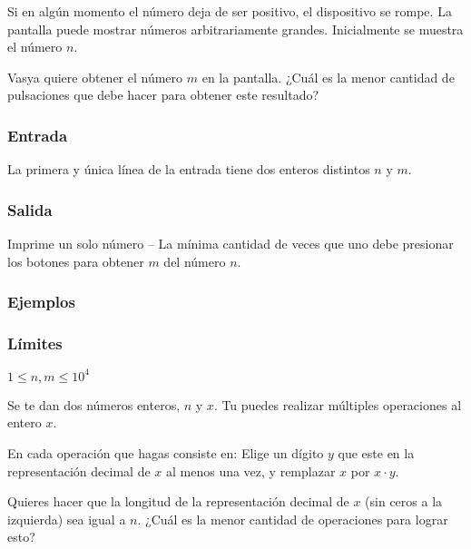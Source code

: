 Si en algún momento el número deja de ser positivo, el dispositivo se rompe. La pantalla puede mostrar números arbitrariamente grandes. Inicialmente se muestra el número \(n\).

Vasya quiere obtener el número \(m\) en la pantalla. ¿Cuál es la menor cantidad de pulsaciones que debe hacer para obtener este resultado?

\subsubsection*{Entrada}
La primera y única línea de la entrada tiene dos enteros distintos \(n\) y \(m\). 

\subsubsection*{Salida}
Imprime un solo número -- La mínima cantidad de veces que uno debe presionar los botones para obtener \(m\) del número \(n\).

\subsubsection*{Ejemplos}
\begin{casebox3}
\end{casebox3}

\subsubsection*{Límites}
\(1\leq n, m \leq 10^4\)

\codeforces  


\problembreak

\problemtitle Se te dan dos números enteros, \(n\) y \(x\). Tu puedes realizar múltiples operaciones al entero \(x\).

En cada operación que hagas consiste en: Elige un dígito \(y\) que este en la representación decimal de \(x\) al menos una vez, y remplazar \(x\) por \(x\cdot y\).

Quieres hacer que la longitud de la representación decimal de \(x\) (sin ceros a la izquierda) sea igual a \(n\). ¿Cuál es la menor cantidad de operaciones para lograr esto?


